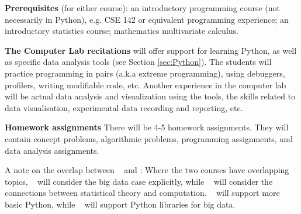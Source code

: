 {\bf Prerequisites} (for either course): an introductory programming
course (not necessarily in Python), e.g. CSE 142 or equivalent
programming experience; an introductory statistics course; mathematics
multivariate calculus. 



{\bf The Computer Lab recitations} will offer support for learning
Python, as well as specific data analysis tools (see Section \ref{sec:Python}).
The students will practice programming in pairs (a.k.a extreme
programming), using debuggers, profilers, writing modifiable code, etc.
Another experience in the computer lab will be actual data analysis
and visualization using the tools, the skills related to data
visualisation, experimental data recording and reporting, etc.

{\bf Homework assignments} There will be 4-5 homework
assignments. They will contain concept problems, algorithmic problems,
programming assignments, and data analysis assignments.

A note on the overlap between \statcl~ and \astrocl: Where the two
courses have overlapping topics, \astrocl~ will consider the big data case
explicitly, while \statcl~ will consider the connections between
statistical theory and computation. \statcl~ will support more basic
Python, while \astrocl~ will support Python libraries for big data.


